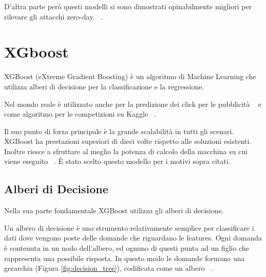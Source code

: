 D'altra parte però questi modelli si sono dimostrati opinabilmente migliori per rilevare gli attacchi zero-day. ~\cite{UnsupervisedAlgorithmsDetect2021}.


\section{XGboost}

XGBoost (eXtreme Gradient Boosting) è un algoritmo di Machine Learning che utilizza alberi di decisione per la classificazione e la regressione. 

Nel mondo reale è utilizzato anche per la predizione dei click per le pubblicità  ~\cite{hePracticalLessonsPredicting2014} e come algoritmo per le competizioni su Kaggle ~\cite{chenXGBoostScalableTree2016}.


Il suo punto di forza principale è la grande scalabilità in tutti gli scenari. XGBoost ha prestazioni superiori di dieci volte rispetto alle soluzioni esistenti.
Inoltre riesce a sfruttare al meglio la potenza di calcolo della macchina su cui viene eseguito ~\cite{chenXGBoostScalableTree2016}.
È stato scelto questo modello per i motivi sopra citati.

\subsection{Alberi di Decisione}

Nella sua parte fondamentale XGBoost utilizza gli alberi di decisione.

Un albero di decisione è uno strumento relativamente semplice per classificare i dati dove vengono poste delle domande che riguardano le features. Ogni domanda è contenuta in un nodo dell'albero, ed ognuno di questi punta ad un figlio che rappresenta una possibile risposta.
In questo modo le domande formano una gerarchia (Figura \ref{fig:decision_tree}), codificata come un albero ~\cite{kingsfordWhatAreDecision2008}.


